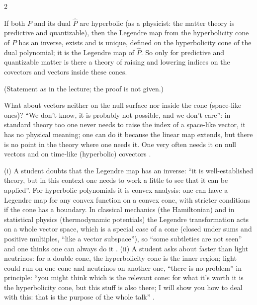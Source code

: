 \begin{paracol}{2}
\begin{theorem}\label{thm:c26-legendre}
If both $P$ and its dual $\hat P$ are hyperbolic (as a physicist: the matter theory is predictive and quantizable), then the Legendre map from the hyperbolicity cone of $P$ has an inverse, exists and is unique, defined on the hyperbolicity cone of the dual polynomial; it is the Legendre map of $\hat P$. So only for predictive and quantizable matter is there a theory of raising and lowering indices on the covectors and vectors inside these cones.
\end{theorem}
(Statement as in the lecture; the proof is not given.)

What about vectors neither on the null surface nor inside the cone (space-like ones)? ``We don't know, it is probably not possible, and we don't care'': in standard theory too one never needs to raise the index of a space-like vector, it has no physical meaning; one can do it because the linear map extends, but there is no point in the theory where one needs it. One very often needs it on null vectors and on time-like (hyperbolic) covectors .

\begin{coursenote}
(i) A student doubts that the Legendre map has an inverse: ``it is well-established theory, but in this context one needs to work a little to see that it can be applied''. For hyperbolic polynomials it is convex analysis: one can have a Legendre map for any convex function on a convex cone, with stricter conditions if the cone has a boundary. In classical mechanics (the Hamiltonian) and in statistical physics (thermodynamic potentials) the Legendre transformation acts on a whole vector space, which is a special case of a cone (closed under sums and positive multiples, ``like a vector subspace''), so ``some subtleties are not seen'' and one thinks one can always do it . (ii) A student asks about faster than light neutrinos: for a double cone, the hyperbolicity cone is the inner region; light could run on one cone and neutrinos on another one, ``there is no problem'' in principle: ``you might think which is the relevant cone: for what it's worth it is the hyperbolicity cone, but this stuff is also there; I will show you how to deal with this: that is the purpose of the whole talk'' .
\end{coursenote}


\end{paracol}
